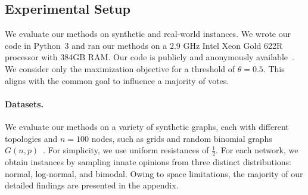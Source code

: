

\subsection{Experimental Setup}

We evaluate our methods on synthetic
and real-world instances.
We wrote our code in Python~3 and ran our methods
on a 2.9 GHz Intel Xeon Gold 622R processor
with 384GB RAM.
Our code is publicly and anonymously
available~\cite{ourgit2024}.
We consider only the
maximization objective for
a threshold of $\theta = 0.5$.
This aligns with the common goal to influence a majority of votes.


\paragraph{Datasets.} We evaluate our methods on a variety of synthetic graphs, each with different topologies and $n=100$ nodes, such as grids and random binomial graphs $G(n,p)$~\cite{erdds1959random}. For simplicity,
we use uniform resistances of $\frac 1 2 $. For each network, we obtain instances by sampling innate opinions from three distinct distributions: normal, log-normal, and bimodal. Owing to space limitations, the majority of our detailed findings are presented in the appendix.
 





 

